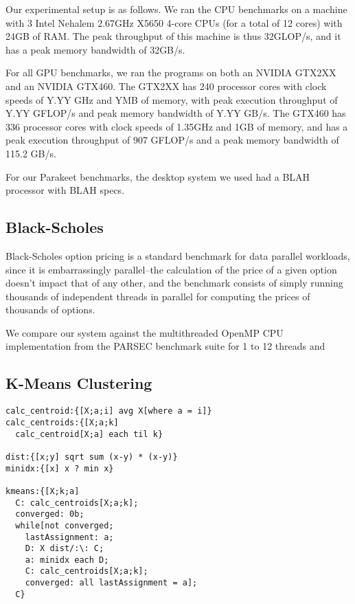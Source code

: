 \documentclass[preprint]{sigplanconf}
\begin{document}
Our experimental setup is as follows.  We ran the CPU benchmarks on a machine
with 3 Intel Nehalem 2.67GHz X5650 4-core CPUs (for a total of 12 cores) with
24GB of RAM.  The peak throughput of this machine is thus 32GLOP/s, and it has
a peak memory bandwidth of 32GB/s.

For all GPU benchmarks, we ran the programs on both an NVIDIA GTX2XX and an
NVIDIA GTX460.  The GTX2XX has 240 processor cores with clock speeds of
Y.YY GHz and YMB of memory, with peak execution throughput of Y.YY GFLOP/s and
peak memory bandwidth of Y.YY GB/s.  The GTX460 has 336 processor cores with
clock speeds of 1.35GHz and 1GB of memory, and has a peak execution throughput
of 907 GFLOP/s and a peak memory bandwidth of 115.2 GB/s.

For our Parakeet benchmarks, the desktop system we used had a BLAH processor
with BLAH specs.

\subsection{Black-Scholes}
Black-Scholes option pricing \cite{Blac73} is a standard benchmark for data
parallel workloads, since it is embarrassingly parallel--the calculation of the
price of a given option doesn't impact that of any other, and the benchmark
consists of simply running thousands of independent threads in parallel for
computing the prices of thousands of options.

We compare our system against the multithreaded OpenMP CPU implementation
from the PARSEC \cite{Bien08} benchmark suite for 1 to 12 threads and 

\subsection{K-Means Clustering}

\begin{lstlisting}[caption=K-Means Clustering implemented in Q]
calc_centroid:{[X;a;i] avg X[where a = i]}
calc_centroids:{[X;a;k] 
  calc_centroid[X;a] each til k}
  
dist:{[x;y] sqrt sum (x-y) * (x-y)}
minidx:{[x] x ? min x}

kmeans:{[X;k;a]
  C: calc_centroids[X;a;k];
  converged: 0b;
  while[not converged;
    lastAssignment: a;
    D: X dist/:\: C;
    a: minidx each D;
    C: calc_centroids[X;a;k];
    converged: all lastAssignment = a];
  C}
\end{lstlisting}
\label{QKMeans}
\end{document}
